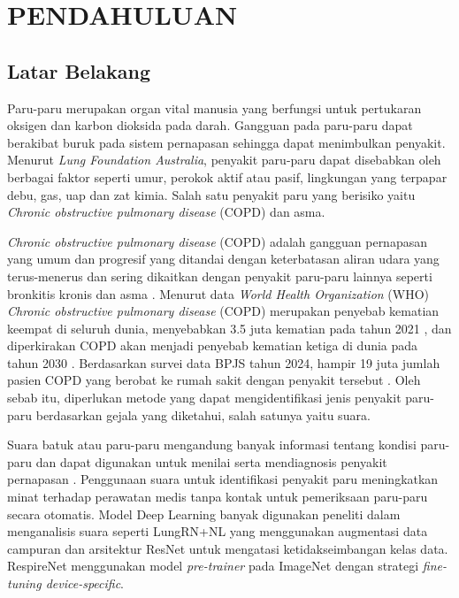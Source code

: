 \chapter{PENDAHULUAN}
\section{Latar Belakang}
\label{section:latarbelakang}
Paru-paru merupakan organ vital manusia yang berfungsi untuk pertukaran oksigen dan karbon dioksida pada darah\cite{Chanda2024}. Gangguan pada paru-paru dapat berakibat buruk pada sistem pernapasan sehingga dapat menimbulkan penyakit. Menurut \textit{Lung Foundation Australia}, penyakit paru-paru dapat disebabkan oleh berbagai faktor seperti umur, perokok aktif atau pasif, lingkungan yang terpapar debu, gas, uap dan zat kimia\cite{Lung_Foundation_Australia_2023}. Salah satu penyakit paru yang berisiko yaitu \textit{Chronic obstructive pulmonary disease} (COPD) dan asma.

\textit{Chronic obstructive pulmonary disease} (COPD) adalah gangguan pernapasan yang umum dan progresif yang ditandai dengan keterbatasan aliran udara yang terus-menerus dan sering dikaitkan dengan penyakit paru-paru lainnya seperti bronkitis kronis dan asma \cite{Muhammad_Afandy_Fadhilah_2024}. Menurut data \textit{World Health Organization} (WHO) \textit{Chronic obstructive pulmonary disease} (COPD) merupakan penyebab kematian keempat di seluruh dunia, menyebabkan 3.5 juta kematian pada tahun 2021 \cite{whoChronicObstructive}, dan diperkirakan COPD akan menjadi penyebab kematian ketiga di dunia pada tahun 2030 \cite{whoEMROChronic}. Berdasarkan survei data BPJS tahun 2024, hampir 19 juta jumlah pasien COPD yang berobat ke rumah sakit dengan penyakit tersebut \cite{bloombergtechnozPasienPPOK}. Oleh sebab itu, diperlukan metode yang dapat mengidentifikasi jenis penyakit paru-paru berdasarkan gejala yang diketahui, salah satunya yaitu suara.

Suara batuk atau paru-paru mengandung banyak informasi tentang kondisi paru-paru dan dapat digunakan untuk menilai serta mendiagnosis penyakit pernapasan \cite{heitmann2023deepbreath}. Penggunaan suara untuk identifikasi penyakit paru meningkatkan minat terhadap perawatan medis tanpa kontak untuk pemeriksaan paru-paru secara otomatis. Model Deep Learning banyak digunakan peneliti dalam menganalisis suara seperti LungRN+NL \cite{ma2020lungrn+} yang menggunakan augmentasi data campuran dan arsitektur ResNet \cite{he2016deep} untuk mengatasi ketidakseimbangan kelas data. RespireNet \cite{gairola2021respirenet} menggunakan model \textit{pre-trainer} pada ImageNet dengan strategi \textit{fine-tuning device-specific}.

